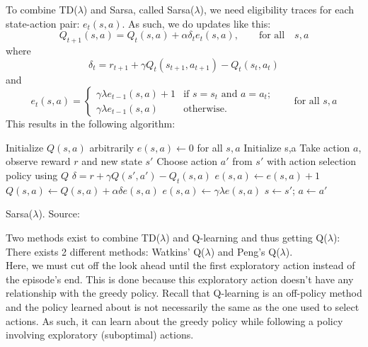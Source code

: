 \documentclass[a4paper]{article}
\begin{document}
To combine TD($\lambda$) and Sarsa, called Sarsa($\lambda$), we need eligibility traces for each state-action pair: $e_t(s,a)$. As such, we do updates like this:
\begin{equation}
Q_{t+1}(s,a) = Q_t(s,a) + \alpha \delta_t e_t(s,a), \qquad \text{for all} \quad s,a
\end{equation}
where
\begin{equation}
\delta_t = r_{t+1} + \gamma Q_t(s_{t+1},a_{t+1}) - Q_t(s_t,a_t)
\end{equation}
and
\begin{equation}
e_t(s,a) = \begin{cases}
	\gamma \lambda e_{t-1}(s,a) + 1 & \text{if $s=s_t$ and $a=a_t$;} \\
	\gamma \lambda e_{t-1}(s,a) & \text{otherwise}.
\end{cases}
\qquad \text{for all $s,a$}
\end{equation}
This results in the following algorithm:\\
\begin{algorithm}[H]
\DontPrintSemicolon
Initialize $Q(s,a)$ arbitrarily\;
$e(s,a) \gets 0$ for all $s,a$\;
 {
	Initialize s,a\;
	 {
    	Take action $a$, observe reward $r$ and new state $s'$\;
        Choose action $a'$ from $s'$ with action selection policy using $Q$\;
        $\delta = r + \gamma Q(s',a') - Q_t(s,a)$\;
        $e(s,a) \gets e(s,a) + 1$\;
         {
        	$Q(s,a) \gets Q(s,a) + \alpha \delta e(s,a)$\;
            $e(s,a) \gets \gamma \lambda e(s,a)$\;
        }
        $s \gets s'$; $a \gets a'$\;
    }
}
\caption{Sarsa($\lambda$). Source: \cite{Sutton1998ReinforcementIntroduction}}
\end{algorithm}
Two methods exist to combine TD($\lambda$) and Q-learning and thus getting Q($\lambda$): There exists 2 different methods: Watkins' Q($\lambda$) and Peng's Q($\lambda$).\\
Here, we must cut off the look ahead until the first exploratory action instead of the episode's end. This is done because this exploratory action doesn't have any relationship with the greedy policy. Recall that Q-learning is an off-policy method and the policy learned about is not necessarily the same as the one used to select actions. As such, it can learn about the greedy policy while following a policy involving exploratory (suboptimal) actions.
\end{document}
